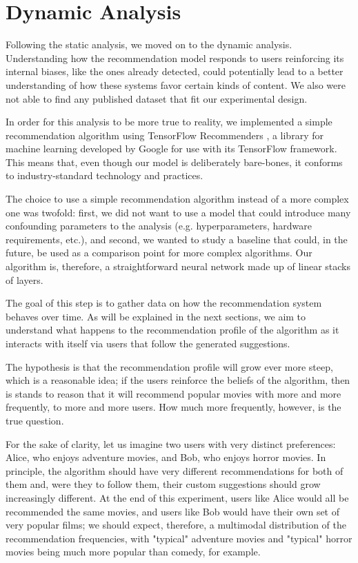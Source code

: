 
\chapter{Dynamic Analysis}
\label{cap:dynamic}

Following the static analysis, we moved on to the dynamic analysis.
Understanding how the recommendation model responds to users reinforcing its
internal biases, like the ones already detected, could potentially lead to a
better understanding of how these systems favor certain kinds of content. We
also were not able to find any published dataset that fit our experimental
design.

In order for this analysis to be more true to reality, we implemented a simple
recommendation algorithm using TensorFlow Recommenders
\citep{noauthor_tensorflow_nodate}, a library for machine learning developed by
Google for use with its TensorFlow \citep{noauthor_tensorflow_nodate-1}
framework. This means that, even though our model is deliberately bare-bones, it
conforms to industry-standard technology and practices.

The choice to use a simple recommendation algorithm instead of a more complex
one was twofold: first, we did not want to use a model that could introduce many
confounding parameters to the analysis (e.g. hyperparameters, hardware
requirements, etc.), and second, we wanted to study a baseline that could, in
the future, be used as a comparison point for more complex algorithms. Our
algorithm is, therefore, a straightforward neural network made up of linear
stacks of layers.

The goal of this step is to gather data on how the recommendation system behaves
over time. As will be explained in the next sections, we aim to understand what
happens to the recommendation profile of the algorithm as it interacts with
itself via users that follow the generated suggestions.

The hypothesis is that the recommendation profile will grow ever more steep,
which is a reasonable idea; if the users reinforce the beliefs of the algorithm,
then is stands to reason that it will recommend popular movies with more and
more frequently, to more and more users. How much more frequently, however, is
the true question.

For the sake of clarity, let us imagine two users with very distinct
preferences: Alice, who enjoys adventure movies, and Bob, who enjoys horror
movies. In principle, the algorithm should have very different recommendations
for both of them and, were they to follow them, their custom suggestions should
grow increasingly different. At the end of this experiment, users like Alice
would all be recommended the same movies, and users like Bob would have their
own set of very popular films; we should expect, therefore, a multimodal
distribution of the recommendation frequencies, with "typical" adventure movies
and "typical" horror movies being much more popular than comedy, for example.

